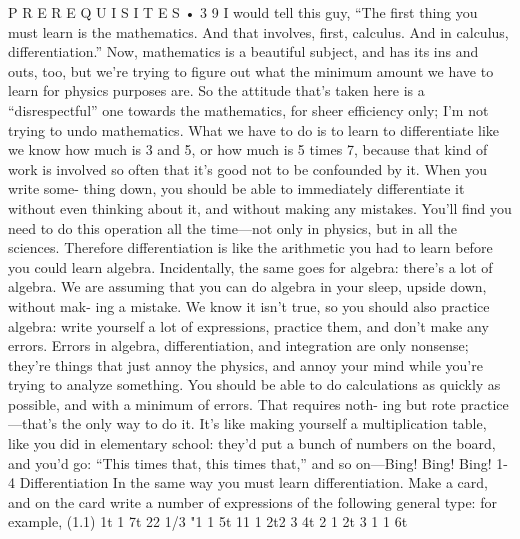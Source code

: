 \documentclass[10pt,oneside]{article}
\begin{document}
P R E R E Q U I S I T E S • 3 9 I would tell this guy, “The first thing you must learn is the mathematics. And that involves, first, calculus. And in calculus, differentiation.” Now, mathematics is a beautiful subject, and has its ins and outs, too, but we’re trying to figure out what the minimum amount we have to learn for physics purposes are. So the attitude that’s taken here is a “disrespectful” one towards the mathematics, for sheer efficiency only; I’m not trying to undo mathematics. What we have to do is to learn to differentiate like we know how much is 3 and 5, or how much is 5 times 7, because that kind of work is involved so often that it’s good not to be confounded by it. When you write some- thing down, you should be able to immediately differentiate it without even thinking about it, and without making any mistakes. You’ll find you need to do this operation all the time---not only in physics, but in all the sciences. Therefore differentiation is like the arithmetic you had to learn before you could learn algebra. Incidentally, the same goes for algebra: there’s a lot of algebra. We are assuming that you can do algebra in your sleep, upside down, without mak- ing a mistake. We know it isn’t true, so you should also practice algebra: write yourself a lot of expressions, practice them, and don’t make any errors. Errors in algebra, differentiation, and integration are only nonsense; they’re things that just annoy the physics, and annoy your mind while you’re trying to analyze something. You should be able to do calculations as quickly as possible, and with a minimum of errors. That requires noth- ing but rote practice---that’s the only way to do it. It’s like making yourself a multiplication table, like you did in elementary school: they’d put a bunch of numbers on the board, and you’d go: “This times that, this times that,” and so on---Bing! Bing! Bing! 1-4 Differentiation In the same way you must learn differentiation. Make a card, and on the card write a number of expressions of the following general type: for example, (1.1) 1t 1 7t 22 1/3 "1 1 5t 11 1 2t2 3 4t 2 1 2t 3 1 1 6t\par
\end{document}

